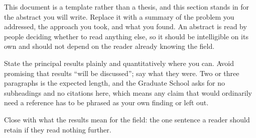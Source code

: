 \ThesisAbstract

This document is a template rather than a thesis, and this section stands in
for the abstract you will write. Replace it with a summary of the problem you
addressed, the approach you took, and what you found. An abstract is read by
people deciding whether to read anything else, so it should be intelligible on
its own and should not depend on the reader already knowing the field.

State the principal results plainly and quantitatively where you can. Avoid
promising that results ``will be discussed''; say what they were. Two or three
paragraphs is the expected length, and the Graduate School asks for no
subheadings and no citations here, which means any claim that would ordinarily
need a reference has to be phrased as your own finding or left out.

Close with what the results mean for the field: the one sentence a reader
should retain if they read nothing further.
